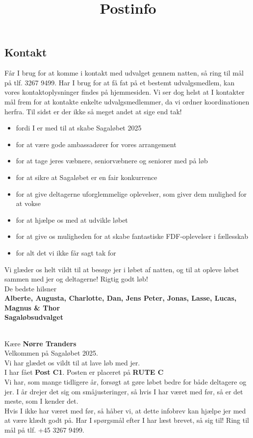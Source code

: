 \subsection{Kontakt}
Får I brug for at komme i kontakt med udvalget gennem natten, så ring til mål på tlf. 3267 9499. Har I brug for at få fat på et bestemt udvalgsmedlem, kan vores kontaktoplysninger findes på hjemmesiden. Vi ser dog helst at I kontakter mål frem for at kontakte enkelte udvalgsmedlemmer, da vi ordner koordinationen herfra.
\newline
Til sidst er der ikke så meget andet at sige end tak!\begin{itemize}
  \item fordi I er med til at skabe Sagaløbet 2025
  \item for at være gode ambassadører for vores arrangement
  \item for at tage jeres væbnere, seniorvæbnere og seniorer med på løb
  \item for at sikre at Sagaløbet er en fair konkurrence
  \item for at give deltagerne uforglemmelige oplevelser, som giver dem mulighed for at vokse
  \item for at hjælpe os med at udvikle løbet
  \item for at give os muligheden for at skabe fantastiske FDF-oplevelser i fællesskab
  \item for alt det vi ikke får sagt tak for
\end{itemize}
Vi glæder os helt vildt til at besøge jer i løbet af natten, og til at opleve løbet sammen med jer og deltagerne!
\newline
Rigtig godt løb!\\
\newline
\textcolor{søblå}{De bedste hilsner}\\
\textcolor{natblå}{\textbf{Alberte, Augusta, Charlotte, Dan, Jens Peter, Jonas, Lasse, Lucas, Magnus \& Thor}}\\
\textcolor{natblå}{\textbf{Sagaløbsudvalget}}\\
\newpage
\title{Postinfo}\\
Kære \textbf{Nørre Tranders}\\
\newline
Velkommen på Sagaløbet 2025.\\
Vi har glædet os vildt til at lave løb med jer.\\
\newline
I har fået \textbf{Post C1}. Posten er placeret på \textbf{RUTE C}\\
Vi har, som mange tidligere år, forsøgt at gøre løbet bedre for både deltagere og jer. I år drejer det sig om småjusteringer, så hvis I har været med før, så er det meste, som I kender det.\\
\newline
Hvis I ikke har været med før, så håber vi, at dette infobrev kan hjælpe jer med at være klædt godt på. Har I spørgsmål efter I har læst brevet, så sig til! Ring til mål på tlf. +45 3267 9499.
